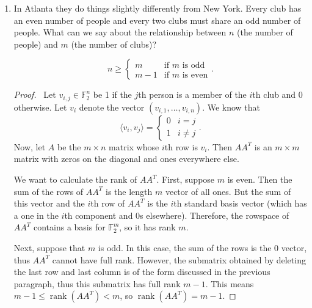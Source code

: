 \documentclass[12pt]{article}
\newcommand{\p}{\mathbb{P}}
\DeclareMathOperator{\rank}{rank}
\begin{document}
\begin{enumerate}[leftmargin=0cm,itemindent=.5cm,labelwidth=\itemindent,labelsep=0cm,align=left]
\begin{proof}
\begin{comment}
Lastly, we need to argue that $\p[\land_{k=1}^\infty \left( X_n = k \text{ before } X_n = 0 \right)] = 0$.  We know that $$\p[\land_{k=1}^\infty \left( X_n = k \text{ before } X_n = 0 \right)] \leq \p[ X_n = k \text{ before } X_n = 0]$$ for all $k$.  All we need to show is that $\lim\limits_{k \rightarrow \infty} \p[ X_n = k \text{ before } X_n = 0] = 0$.  This is intuitively true, so I will not go through the details of showing it.  Therefore, the walker eventually returns home with probability 1.
\end{comment}
\end{proof}

\item In Atlanta they do things slightly differently from New York. Every club has an even number of people and every two clubs must share an odd number of people. What can we say about the relationship between $n$ (the number of people) and $m$ (the number of clubs)?

\noindent
$$
n \geq
\begin{cases}
m & \text{if } m \text{ is odd} \\
m-1 & \text{if } m \text { is even}
\end{cases}.
$$

\begin{proof}
\ Let $v_{i,j} \in \mathbb{F}_2^n$ be 1 if the $j$th person is a member of the $i$th club and 0 otherwise.  Let $v_i$ denote the vector $(v_{i,1}, \dots , v_{i,n})$.  We know that
$$
\langle v_i , v_j \rangle =
\begin{cases}
0 & i = j \\
1 & i \neq j
\end{cases}.
$$
Now, let $A$ be the $m \times n$ matrix whose $i$th row is $v_i$.  Then $AA^T$ is an $m \times m$ matrix with zeros on the diagonal and ones everywhere else.

We want to calculate the rank of $AA^T$.  First, suppose $m$ is even.  Then the sum of the rows of $AA^T$ is the length $m$ vector of all ones.  But the sum of this vector and the $i$th row of $AA^T$ is the $i$th standard basis vector (which has a one in the $i$th component and $0$s elsewhere).  Therefore, the rowspace of $AA^T$ contains a basis for $\mathbb{F}_2^m$, so it has rank $m$.  

Next, suppose that $m$ is odd.  In this case, the sum of the rows is the $0$ vector, thus $AA^T$ cannot have full rank.  However, the submatrix obtained by deleting the last row and last column is of the form discussed in the previous paragraph, thus this submatrix has full rank $m-1$.  This means $m-1 \leq \rank(AA^T) < m$, so $\rank(AA^T) = m-1$.%


\end{proof}
\end{enumerate}
\end{document}
